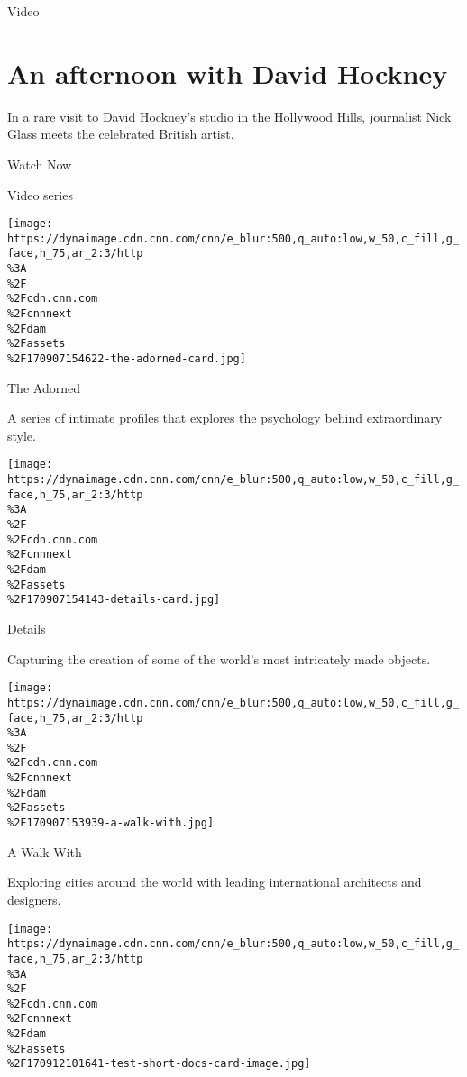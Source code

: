 \href{/}{}\href{/style}{}

Video

\href{https://www.cnn.com/style/videos/arts/2018/01/29/david-hockney-nick-glass-style-orig.cnn}{}

\hypertarget{an-afternoon-with-david-hockney}{%
\section{An afternoon with David
Hockney}\label{an-afternoon-with-david-hockney}}

In a rare visit to David Hockney's studio in the Hollywood Hills,
journalist Nick Glass meets the celebrated British artist.

\href{https://www.cnn.com/style/videos/arts/2018/01/29/david-hockney-nick-glass-style-orig.cnn}{}

Watch Now

Video series

\href{/style/specials/the-adorned}{}

\texttt{[image: https://dynaimage.cdn.cnn.com/cnn/e\_blur:500,q\_auto:low,w\_50,c\_fill,g\_face,h\_75,ar\_2:3/http\\\%3A\\\%2F\\\%2Fcdn.cnn.com\\\%2Fcnnnext\\\%2Fdam\\\%2Fassets\\\%2F170907154622-the-adorned-card.jpg]}

The Adorned

A series of intimate profiles that explores the psychology behind
extraordinary style.

\href{/style/specials/details}{}

\texttt{[image: https://dynaimage.cdn.cnn.com/cnn/e\_blur:500,q\_auto:low,w\_50,c\_fill,g\_face,h\_75,ar\_2:3/http\\\%3A\\\%2F\\\%2Fcdn.cnn.com\\\%2Fcnnnext\\\%2Fdam\\\%2Fassets\\\%2F170907154143-details-card.jpg]}

Details

Capturing the creation of some of the world's most intricately made
objects.

\href{/style/specials/a-walk-with}{}

\texttt{[image: https://dynaimage.cdn.cnn.com/cnn/e\_blur:500,q\_auto:low,w\_50,c\_fill,g\_face,h\_75,ar\_2:3/http\\\%3A\\\%2F\\\%2Fcdn.cnn.com\\\%2Fcnnnext\\\%2Fdam\\\%2Fassets\\\%2F170907153939-a-walk-with.jpg]}

A Walk With

Exploring cities around the world with leading international architects
and designers.

\href{http://www.cnn.com/style/specials/short-docs}{}

\texttt{[image: https://dynaimage.cdn.cnn.com/cnn/e\_blur:500,q\_auto:low,w\_50,c\_fill,g\_face,h\_75,ar\_2:3/http\\\%3A\\\%2F\\\%2Fcdn.cnn.com\\\%2Fcnnnext\\\%2Fdam\\\%2Fassets\\\%2F170912101641-test-short-docs-card-image.jpg]}

